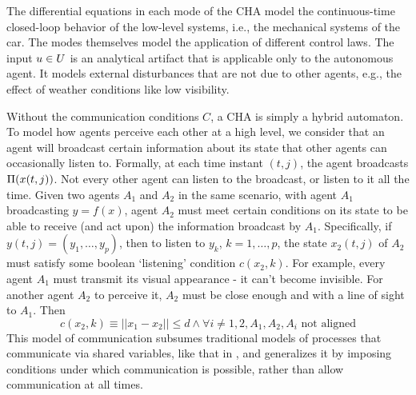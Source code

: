 
	
The differential equations in each mode of the CHA model the continuous-time closed-loop behavior of the low-level systems, i.e., the mechanical systems of the car.
The modes themselves model the application of different control laws. 
The input $u \in U$ is an analytical artifact that is applicable only to the autonomous agent.
It models external disturbances that are not due to other agents, e.g., the effect of weather conditions like low visibility. 

Without the communication conditions $C$, a CHA is simply a hybrid automaton.
To model how agents perceive each other at a high level, we consider that an agent will broadcast certain information about its state that other agents can occasionally listen to.
Formally, at each time instant $(t,j)$, the agent broadcasts $\Pi(x(t,j))$.
Not every other agent can listen to the broadcast, or listen to it all the time.
Given two agents $A_1$ and $A_2$ in the same scenario, with agent $A_1$ broadcasting $y = f(x)$, agent $A_2$ must meet certain conditions on its state to be able to receive (and act upon) the information broadcast by $A_1$.
Specifically, if $y(t,j) = (y_1,\ldots,y_p)$, then to listen to $y_k$, $k=1,\ldots,p$, the state $x_2(t,j)$ of $A_2$ must satisfy some boolean `listening' condition $c(x_2,k)$.
For example, every agent $A_1$ must transmit its visual appearance - it can't become invisible.
For another agent $A_2$ to perceive it, $A_2$ must be close enough and with a line of sight to $A_1$. 
Then 
\[c(x_2,k) \equiv ||x_1 - x_2 || \leq d \land \forall i\neq 1,2, A_1,A_2,A_i \text{ not aligned}\]
This model of communication subsumes traditional models of processes that communicate via shared variables, like that in \cite{AnandFHJL_GeneratingReliableCode10}, and generalizes it by imposing conditions under which communication is possible, rather than allow communication at all times.

